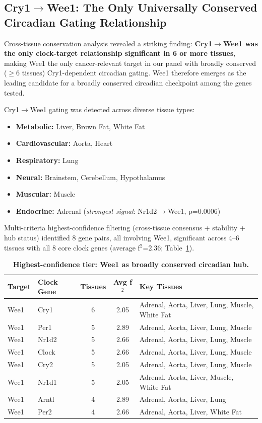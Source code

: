 \documentclass[11pt,a4paper]{article}
\begin{document}
\subsection{Cry1$\rightarrow$Wee1: The Only Universally Conserved Circadian Gating Relationship}

Cross-tissue conservation analysis revealed a striking finding: \textbf{Cry1$\rightarrow$Wee1 was the only clock-target relationship significant in 6 or more tissues}, making Wee1 the only cancer-relevant target in our panel with broadly conserved ($\geq$6 tissues) Cry1-dependent circadian gating. Wee1 therefore emerges as the leading candidate for a broadly conserved circadian checkpoint among the genes tested.

Cry1$\rightarrow$Wee1 gating was detected across diverse tissue types:
\begin{itemize}[noitemsep]
    \item \textbf{Metabolic:} Liver, Brown Fat, White Fat
    \item \textbf{Cardiovascular:} Aorta, Heart
    \item \textbf{Respiratory:} Lung
    \item \textbf{Neural:} Brainstem, Cerebellum, Hypothalamus
    \item \textbf{Muscular:} Muscle
    \item \textbf{Endocrine:} Adrenal (\textit{strongest signal}: Nr1d2$\rightarrow$Wee1, p=0.0006)
\end{itemize}

Multi-criteria highest-confidence filtering (cross-tissue consensus + stability + hub status) identified 8 gene pairs, all involving Wee1, significant across 4--6 tissues with all 8 core clock genes (average f$^2$=2.36; Table~\ref{tab:wee1_hub}).

\begin{table}[H]
\centering
\caption{\textbf{Highest-confidence tier: Wee1 as broadly conserved circadian hub.}}
\label{tab:wee1_hub}
\begin{tabular}{llccl}
\toprule
Target & Clock Gene & Tissues & Avg f$^2$ & Key Tissues \\
\midrule
Wee1 & Cry1 & 6 & 2.05 & Adrenal, Aorta, Liver, Lung, Muscle, White Fat \\
Wee1 & Per1 & 5 & 2.89 & Adrenal, Aorta, Liver, Lung, Muscle \\
Wee1 & Nr1d2 & 5 & 2.66 & Adrenal, Aorta, Liver, Lung, Muscle \\
Wee1 & Clock & 5 & 2.66 & Adrenal, Aorta, Liver, Lung, Muscle \\
Wee1 & Cry2 & 5 & 2.05 & Adrenal, Aorta, Liver, Lung, Muscle \\
Wee1 & Nr1d1 & 5 & 2.05 & Adrenal, Aorta, Liver, Muscle, White Fat \\
Wee1 & Arntl & 4 & 2.89 & Adrenal, Aorta, Liver, Lung \\
Wee1 & Per2 & 4 & 2.66 & Adrenal, Aorta, Liver, White Fat \\
\bottomrule
\end{tabular}
\end{table}
\end{document}
